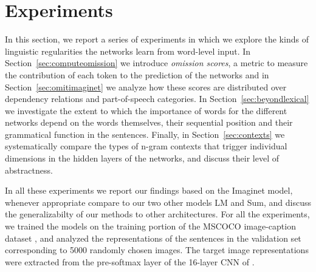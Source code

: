 \section{Experiments}
\label{sec:experiments}


In this section, we report a series of experiments in which
we explore the kinds of linguistic regularities the networks learn from
word-level input. 
In Section~\ref{sec:computeomission} we introduce \emph{omission scores},
a metric to measure the contribution of each token to the prediction
of the networks and in Section~\ref{sec:omitimaginet} we analyze how
these scores are distributed over dependency relations and
part-of-speech categories. 
In Section~\ref{sec:beyondlexical} we investigate the extent to which
the importance of words for the different networks depend on the words themselves,
their sequential position and their grammatical function in the sentences.
Finally, in Section~\ref{sec:contexts} we systematically compare the types of 
n-gram contexts that trigger individual dimensions in the hidden layers of the 
networks, and discuss their level of abstractness.

In all these experiments we report our findings based on the {\sc Imaginet}
model, whenever appropriate compare to our two other models {\sc LM} and {\sc Sum}, 
and discuss the generalizabilty of our methods to other architectures.
\label{edit:experimentsgeneral}
For all the experiments, we trained the models on the training portion of the
MSCOCO image-caption dataset \cite{lin2014microsoft}, and analyzed the
representations of the sentences in the validation set corresponding
to 5000 randomly chosen images. The target image representations were
extracted from the pre-softmax layer of the 16-layer CNN of
.



